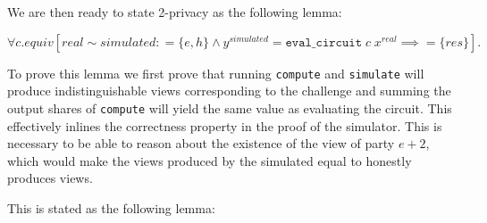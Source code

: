 We are then ready to state 2-privacy as the following lemma:
\begin{lemma}
  \label{lem:zkboo:decomposition:privacy}
  \[
    \forall c.equiv[real \sim simulated : =\{e, h\} \land y^{simulated} = \texttt{eval\_{circuit}} \; c \; x^{real} \implies =\{res\}].
  \]

\end{lemma}

To prove this lemma we first prove that running \texttt{compute} and
\texttt{simulate} will produce indistinguishable
views corresponding to the challenge and summing the output shares of
\texttt{compute} will yield the same value as evaluating the circuit. This
effectively inlines the correctness property in the proof of the simulator. This
is necessary to be able to reason about the existence of the view of party
$e+2$, which would make the views produced by the simulated equal to honestly
produces views.

This is stated as the following lemma:

